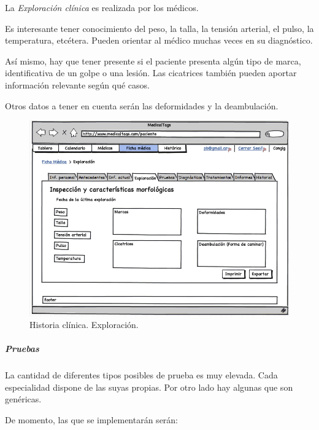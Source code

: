 			La \textit{Exploración clínica} es realizada por los médicos. 
			
			Es interesante tener conocimiento del peso, la talla, la tensión arterial, el pulso, la temperatura, etcétera. Pueden orientar al médico muchas veces en su diagnóstico.
			
			Así mismo, hay que tener presente si el paciente presenta algún tipo de marca, identificativa de un golpe o una lesión. Las cicatrices también pueden aportar información relevante según qué casos.
			
			Otros datos a tener en cuenta serán las deformidades y la deambulación.
			
						
			\begin{figure}[H]
			  \centering
			    \includegraphics[width=12cm]{img/png/interfaz/33_Exploracion_paciente.png}
			  \caption{Historia clínica. Exploración.}
			  \label{fig:iu_exploracion}
			\end{figure}
			
		

		\subparagraph{Pruebas} %
		\label{par:inter_pruebas}
			
			La cantidad de diferentes tipos posibles de prueba es muy elevada. Cada especialidad dispone de las suyas propias. Por otro lado hay algunas que son genéricas.
			
			De momento, las que se implementarán serán:
	
